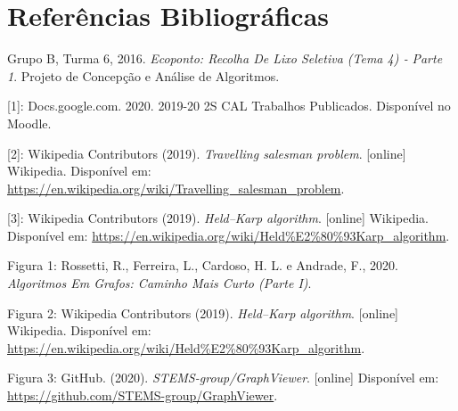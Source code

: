 \documentclass[article, a4paper, 12pt, oneside]{memoir}
\begin{document}
\newpage
\chapter[Referências Bibliográficas][Referências Bibliográficas]{Referências Bibliográficas} \label{\thechapter}
Grupo B, Turma 6, 2016. \textit{Ecoponto: Recolha De Lixo Seletiva (Tema 4) ‐ Parte 1}. Projeto de Concepção e Análise de Algoritmos.

[1]: Docs.google.com. 2020. 2019-20 2S CAL Trabalhos Publicados. Disponível no Moodle.

[2]: Wikipedia Contributors (2019). \textit{Travelling salesman problem}. [online] Wikipedia. Disponível em: \url{https://en.wikipedia.org/wiki/Travelling_salesman_problem}.

[3]: Wikipedia Contributors (2019). \textit{Held–Karp algorithm}. [online] Wikipedia. Disponível em: \url{https://en.wikipedia.org/wiki/Held%E2%80%93Karp_algorithm}.

Figura 1: Rossetti, R., Ferreira, L., Cardoso, H. L. e Andrade, F., 2020. \textit{Algoritmos Em Grafos: Caminho Mais Curto (Parte I)}.

Figura 2: Wikipedia Contributors (2019). \textit{Held–Karp algorithm}. [online] Wikipedia. Disponível em: \url{https://en.wikipedia.org/wiki/Held%E2%80%93Karp_algorithm}.

Figura 3: GitHub. (2020). \textit{STEMS-group/GraphViewer}. [online] Disponível em: \url{https://github.com/STEMS-group/GraphViewer}.

‌

‌

\newpage
\end{document}
